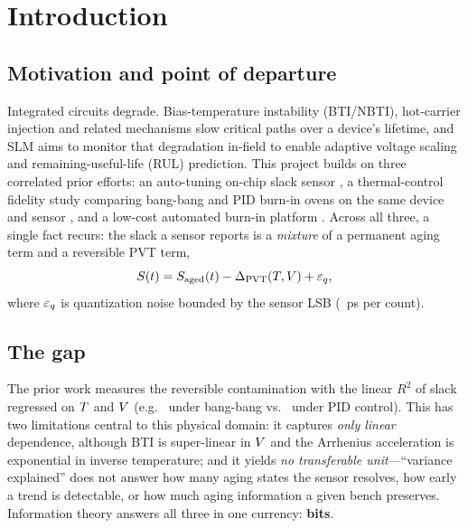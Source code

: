 \section{Introduction}
\label{sec:intro}


\subsection{Motivation and point of departure}
Integrated circuits degrade. Bias-temperature instability (BTI/NBTI), hot-carrier
injection and related mechanisms slow critical paths over a device's lifetime,
and SLM aims to monitor that degradation in-field to enable adaptive voltage
scaling and remaining-useful-life (RUL) prediction. This project builds on three
correlated prior efforts: an auto-tuning on-chip slack sensor
\cite{nogueira_sensor}, a thermal-control fidelity study comparing bang-bang and
PID burn-in ovens on the same device and sensor \cite{alencar_fidelity}, and a
low-cost automated burn-in platform \cite{alencarfilho_tcc}. Across all three, a
single fact recurs: the slack a sensor reports is a \emph{mixture} of a
permanent aging term and a reversible PVT term,
\begin{equation}
  S(t) = S_{\mathrm{aged}}(t) - \Delta_{\mathrm{PVT}}(T,V) + \varepsilon_q ,
  \label{eq:model}
\end{equation}
where $\varepsilon_q$ is quantization noise bounded by the sensor LSB
(\valLSBps~ps per count).

\subsection{The gap}
The prior work measures the reversible contamination with the linear $R^2$ of
slack regressed on $T$ and $V$ (e.g.\ \valRsqBangBang{} under bang-bang
vs.\ \valRsqPid{} under PID control). This has two limitations central to this
physical domain: it captures \emph{only linear} dependence, although BTI is
super-linear in $V$ and the Arrhenius acceleration is exponential in
inverse temperature; and it yields \emph{no transferable unit}---``variance
explained'' does not answer how many aging states the sensor resolves, how early
a trend is detectable, or how much aging information a given bench preserves.
Information theory answers all three in one currency: \textbf{bits}.

